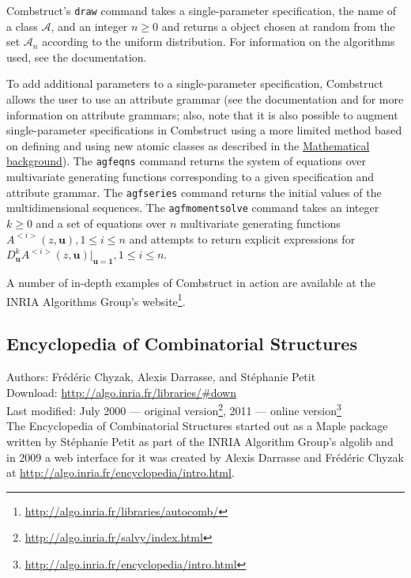 \documentclass[12pt]{article}
\theoremstyle{plain}
\newcommand{\codefont}[1]{{\fontshape{n}\texttt{#1}}}
\begin{document}
Combstruct's \codefont{draw} command takes a single-parameter specification, the name of a class \( \mathcal{A} \), and an integer \( n \geq 0 \) and returns a object chosen at random from the set \( \mathcal{A}_n \) according to the uniform distribution.
For information on the algorithms used, see the documentation.

To add additional parameters to a single-parameter specification, Combstruct allows the user to use an attribute grammar (see the documentation and \cite{attributegrammars} for more information on attribute grammars; also, note that it is also possible to augment single-parameter specifications in Combstruct using a more limited method
based on defining and using new atomic classes as described in the \hyperlink{atomic}{Mathematical background}).
The \codefont{agfeqns} command returns the system of equations over multivariate generating functions corresponding to a  given specification and attribute grammar.
The \codefont{agfseries} command returns the initial values of the multidimensional sequences.
The \codefont{agfmomentsolve} command takes an integer \(k \geq 0 \) and a set of equations over \( n \) multivariate generating functions \(A^{<i>}(z, \boldsymbol{u}), 1 \leq i \leq n \) and attempts to return explicit expressions for \( D_{\boldsymbol{u}}^k A^{<i>}(z, \boldsymbol{u})|_{\boldsymbol{u} = \boldsymbol{1}}, 1 \leq i \leq n\).

A number of in-depth examples of Combstruct in action are available at the INRIA Algorithms Group's website\footnote{
 \url{http://algo.inria.fr/libraries/autocomb/}
}.


\subsection{Encyclopedia of Combinatorial Structures}
\label{sec:encyclopedia}

Authors: Fr\'ed\'eric Chyzak, Alexis Darrasse, and St\'ephanie Petit
\\
Download: \url{http://algo.inria.fr/libraries/\#down}
\\
Last modified: July 2000 --- original version\footnote{
 \url{http://algo.inria.fr/salvy/index.html}
},
2011 --- online version\footnote{
 \url{http://algo.inria.fr/encyclopedia/intro.html}
}
\\

The Encyclopedia of Combinatorial Structures started out as a Maple package written by St\'ephanie Petit as part of the INRIA Algorithm Group's algolib and in 2009 a web interface for it was created by Alexis Darrasse and Fr\'ed\'eric Chyzak at \url{http://algo.inria.fr/encyclopedia/intro.html}.
\end{document}

